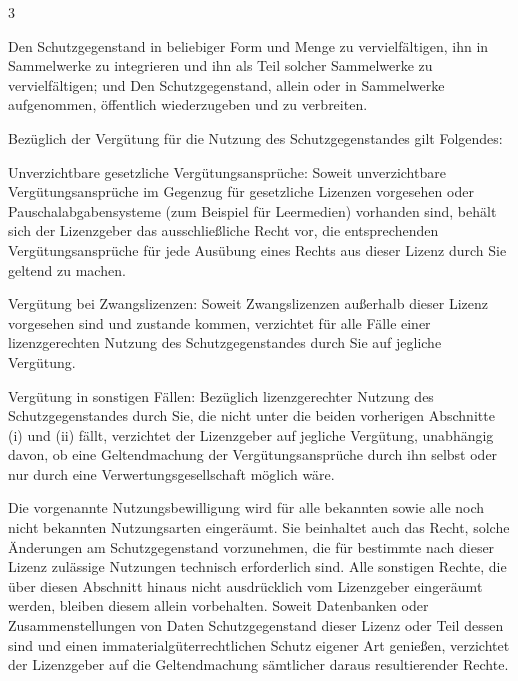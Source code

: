 \begin{WidePar}
\begin{multicols}{3}
\begin{description}
  \begin{compactitem}
    \item Den Schutzgegenstand in beliebiger Form und Menge zu
    vervielfältigen, ihn in Sammelwerke zu integrieren und
    ihn als Teil solcher Sammelwerke zu vervielfältigen; und
    Den Schutzgegenstand, allein oder in Sammelwerke
    aufgenommen, öffentlich wiederzugeben und zu verbreiten.
    \item Bezüglich der Vergütung für die Nutzung des
    Schutzgegenstandes gilt Folgendes:
    \begin{compactitem}
      \item Unverzichtbare gesetzliche Vergütungsansprüche:
      Soweit unverzichtbare Vergütungsansprüche im
      Gegenzug für gesetzliche Lizenzen vorgesehen oder
      Pauschalabgabensysteme (zum Beispiel für Leermedien)
      vorhanden sind, behält sich der Lizenzgeber das
      ausschließliche Recht vor, die entsprechenden
      Vergütungsansprüche für jede Ausübung eines Rechts
      aus dieser Lizenz durch Sie geltend zu machen.
      \item Vergütung bei Zwangslizenzen: Soweit Zwangslizenzen
      außerhalb dieser Lizenz vorgesehen sind und zustande
      kommen, verzichtet für alle Fälle einer
      lizenzgerechten Nutzung des Schutzgegenstandes durch
      Sie auf jegliche Vergütung.
      \item Vergütung in sonstigen Fällen: Bezüglich
      lizenzgerechter Nutzung des Schutzgegenstandes durch
      Sie, die nicht unter die beiden vorherigen
      Abschnitte (i) und (ii) fällt, verzichtet der
      Lizenzgeber auf jegliche Vergütung, unabhängig
      davon, ob eine Geltendmachung der
      Vergütungsansprüche durch ihn selbst oder nur durch
      eine Verwertungsgesellschaft möglich wäre.
    \end{compactitem}
  \end{compactitem}
  Die vorgenannte Nutzungsbewilligung wird für alle bekannten
  sowie alle noch nicht bekannten Nutzungsarten eingeräumt.
  Sie beinhaltet auch das Recht, solche Änderungen am
  Schutzgegenstand vorzunehmen, die für bestimmte nach dieser
  Lizenz zulässige Nutzungen technisch erforderlich sind. Alle
  sonstigen Rechte, die über diesen Abschnitt hinaus nicht
  ausdrücklich vom Lizenzgeber eingeräumt werden, bleiben
  diesem allein vorbehalten. Soweit Datenbanken oder
  Zusammenstellungen von Daten Schutzgegenstand dieser Lizenz
  oder Teil dessen sind und einen immaterialgüterrechtlichen
  Schutz eigener Art genießen, verzichtet der Lizenzgeber auf
  die Geltendmachung sämtlicher daraus resultierender Rechte.
  

\end{description}
\end{multicols}
\end{WidePar}
